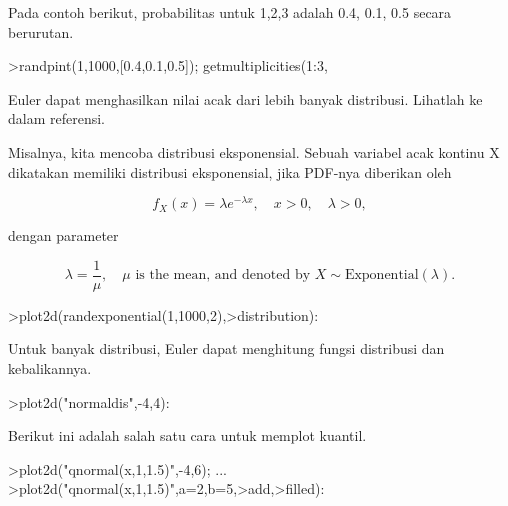 \documentclass[12pt,arial,letterpaper]{book}
\begin{document}
\begin{eulernootebook}
\begin{eulercomment}
\begin{eulercomment}
\begin{eulernootebook}
\begin{eulercomment}
\begin{eulercomment}
\begin{eulercomment}
\begin{eulercomment}
\begin{eulercomment}
\begin{eulercomment}
\begin{eulercomment}
\begin{eulercomment}
Pada contoh berikut, probabilitas untuk 1,2,3 adalah 0.4, 0.1, 0.5
secara berurutan.
\end{eulercomment}
\begin{eulerprompt}
>randpint(1,1000,[0.4,0.1,0.5]); getmultiplicities(1:3,%
\end{eulerprompt}
\begin{euleroutput}
  [378,  102,  520]
\end{euleroutput}
\begin{eulercomment}
Euler dapat menghasilkan nilai acak dari lebih banyak distribusi.
Lihatlah ke dalam referensi.

Misalnya, kita mencoba distribusi eksponensial. Sebuah variabel acak
kontinu X dikatakan memiliki distribusi eksponensial, jika PDF-nya
diberikan oleh\\
\end{eulercomment}
\begin{eulerformula}
\[
f_X(x)=\lambda e^{-\lambda x},\quad x>0,\quad \lambda>0,
\]
\end{eulerformula}
\begin{eulercomment}
dengan parameter\\
\end{eulercomment}
\begin{eulerformula}
\[
\lambda=\frac{1}{\mu},\quad \mu \text{ is the mean, and denoted by } X \sim \text{Exponential}(\lambda).
\]
\end{eulerformula}
\begin{eulerprompt}
>plot2d(randexponential(1,1000,2),>distribution):
\end{eulerprompt}
\begin{eulercomment}
Untuk banyak distribusi, Euler dapat menghitung fungsi distribusi dan
kebalikannya.
\end{eulercomment}
\begin{eulerprompt}
>plot2d("normaldis",-4,4): 
\end{eulerprompt}
\begin{eulercomment}
Berikut ini adalah salah satu cara untuk memplot kuantil.
\end{eulercomment}
\begin{eulerprompt}
>plot2d("qnormal(x,1,1.5)",-4,6);  ...
>plot2d("qnormal(x,1,1.5)",a=2,b=5,>add,>filled):
\end{eulerprompt}

\end{eulercomment}
\end{eulercomment}
\end{eulercomment}
\end{eulercomment}
\end{eulercomment}
\end{eulercomment}
\end{eulercomment}
\end{eulernootebook}
\end{eulercomment}
\end{eulercomment}
\end{eulernootebook}
\end{document}
